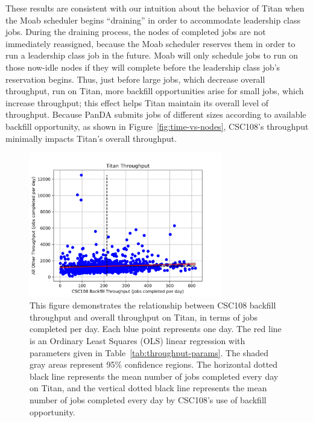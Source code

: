These results are consistent with our intuition about the behavior of Titan
when the Moab scheduler begins ``draining'' in order to accommodate leadership
class jobs. During the draining process, the nodes of completed jobs are not
immediately reassigned, because the Moab scheduler reserves them in order to
run a leadership class job in the future. Moab will only schedule jobs to run
on those now-idle nodes if they will complete before the leadership class job's
reservation begins. Thus, just before large jobs, which decrease overall
throughput, run on Titan, more backfill opportunities arise for small jobs,
which increase throughput; this effect helps Titan maintain its overall level
of throughput. Because PanDA submits jobs of different sizes according to
available backfill opportunity, as shown in Figure~\ref{fig:time-vs-nodes},
CSC108's throughput minimally impacts Titan's overall throughput.

\begin{figure}
  \includegraphics[width=0.75\textwidth]{images/linfit-throughput-all.png}
\caption{This figure demonstrates the relationship between CSC108 backfill
throughput and overall throughput on Titan, in terms of jobs completed per day.
Each blue point represents one day. The red line is an Ordinary Least Squares
(OLS) linear regression with parameters given in
Table~\ref{tab:throughput-params}. The shaded gray areas represent 95\%
confidence regions. The horizontal dotted black line represents the mean number
of jobs completed every day on Titan, and the vertical dotted black line
represents the mean number of jobs completed every day by CSC108's use of
backfill opportunity.}
\label{fig:throughput-all}
\end{figure}

